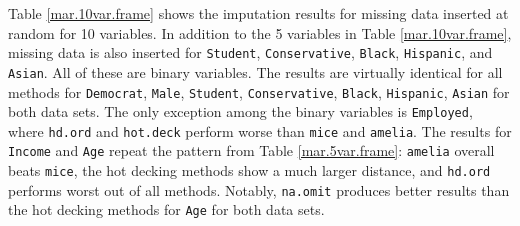 \documentclass[12pt,econ]{sources/authesis}
\begin{document}
Table \ref{mar.10var.frame} shows the imputation results for missing data inserted at random for 10 variables. In addition to the 5 variables in Table \ref{mar.10var.frame}, missing data is also inserted for \texttt{Student}, \texttt{Conservative}, \texttt{Black}, \texttt{Hispanic}, and \texttt{Asian}. All of these are binary variables. The results are virtually identical for all methods for \texttt{Democrat}, \texttt{Male}, \texttt{Student}, \texttt{Conservative}, \texttt{Black}, \texttt{Hispanic}, \texttt{Asian} for both data sets. The only exception among the binary variables is \texttt{Employed}, where \texttt{hd.ord} and \texttt{hot.deck} perform worse than \texttt{mice} and \texttt{amelia}. The results for \texttt{Income} and \texttt{Age} repeat the pattern from Table \ref{mar.5var.frame}: \texttt{amelia} overall beats \texttt{mice}, the hot decking methods show a much larger distance, and \texttt{hd.ord} performs worst out of all methods. Notably, \texttt{na.omit} produces better results than the hot decking methods for \texttt{Age} for both data sets.

\ssp
\end{document}
